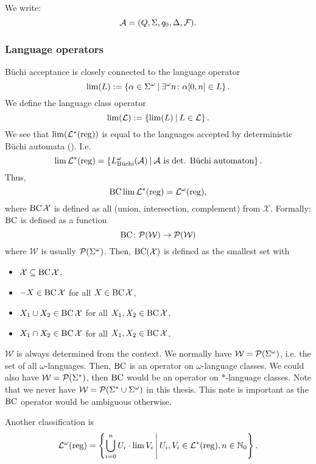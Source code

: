 We write:
\[ \mathcal{A} = (Q, \Sigma, q_0, \Delta, \mathcal{F}) . \]

\subsubsection{Language operators}
\label{reg:omega:vialangop}

Büchi acceptance is closely connected to the language operator
\[ \lim(L) := \Set{ \alpha \in \Sigma^\omega }{ \existsinf n \colon \alpha[0,n] \in L } . \]
We define the language class operator
\[ \lim(\Lang) := \Set{\lim(L)}{L \in \Lang} . \]
We see that $\lim(\mathcal{L}^*(\textup{\textrm{reg}}))$ is equal to the languages accepted by deterministic Büchi automata (\cite{InfCompR101}). %
I.e.
\[ \lim \Langreg = \Set{L^\omega_\text{Büchi}(\A)}{\text{$\A$ is det. Büchi automaton}} . \]
Thus,
\[  \operatorname{BC} \lim \mathcal{L}^*(\textup{\textrm{reg}}) = \mathcal{L}^\omega(\textup{\textrm{reg}}) , \]
where $\operatorname{BC} \mathcal{X}$ is defined as all  (union, intersection, complement) from $\mathcal{X}$. Formally: $\operatorname{BC}$ is defined as a function
\[ \operatorname{BC} \colon \mathcal{P}(\mathcal{W}) \rightarrow \mathcal{P}(\mathcal{W}) \]
where $\mathcal{W}$ is usually $\mathcal{P}(\Sigma^\omega)$. Then, $\operatorname{BC}(\mathcal{X})$ is defined as the smallest set with
\begin{itemize}
\item $\mathcal{X} \subseteq \operatorname{BC} \mathcal{X}$,
\item $-X \in \operatorname{BC} \mathcal{X}$ for all $X \in \operatorname{BC} \mathcal{X}$,
\item $X_1 \cup X_2 \in \operatorname{BC} \mathcal{X}$ for all $X_1,X_2 \in \operatorname{BC} \mathcal{X}$,
\item $X_1 \cap X_2 \in \operatorname{BC} \mathcal{X}$ for all $X_1,X_2 \in \operatorname{BC} \mathcal{X}$.
\end{itemize}
$\mathcal{W}$ is always determined from the context. We normally have $\mathcal{W} = \mathcal{P}(\Sigma^\omega)$, i.e. the set of all $\omega$-languages. Then, $\operatorname{BC}$ is an operator on $\omega$-language classes. We could also have $\mathcal{W} = \mathcal{P}(\Sigma^*)$, then $\operatorname{BC}$ would be an operator on $*$-language classes. Note that we never have $\mathcal{W} = \mathcal{P}(\Sigma^* \cup \Sigma^\omega)$ in this thesis. This note is important as the $\operatorname{BC}$ operator would be ambiguous otherwise.

Another classification is
\[ \LangOreg = \Set{ \bigcup_{i=0}^n U_i \cdot \lim V_i }{ U_i, V_i \in \Langreg, n \in \N_0 } . \]

